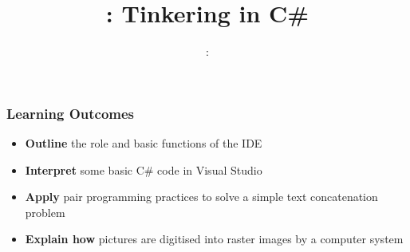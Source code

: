 \usepackage{../../beamerthemeFalmouthGamesAcademy}
\usepackage{multimedia}
\graphicspath{ {../../} }

\usepackage{textcomp}


\usepackage[normalem]{ulem}
\usepackage{wasysym}
\usepackage{pdfpages}

\usetikzlibrary{arrows,automata}







\title{\sessionnumber: Tinkering in C\#}
\subtitle{\modulecode: \moduletitle}

\frame{\titlepage} 

\begin{frame}
	\frametitle{Learning Outcomes}
	\begin{itemize}
		\item \textbf{Outline} the role and basic functions of the IDE
		\item\textbf{Interpret} some basic C\# code in Visual Studio
		\item \textbf{Apply} pair programming practices to solve a simple text concatenation problem
		\item \textbf{Explain how} pictures are digitised into raster images by a computer system
	\end{itemize}
\end{frame}









